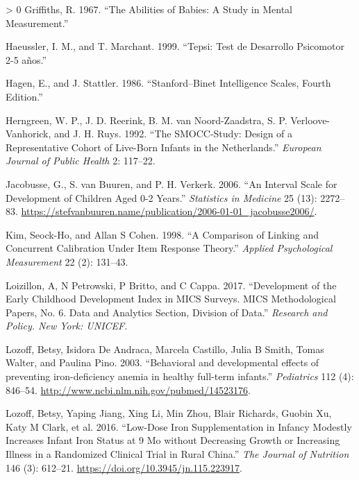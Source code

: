 \documentclass[
]{book}
\newlength{\cslhangindent}
\newenvironment{CSLReferences}[3] %
 {%
  \setlength{\parindent}{0pt}
  \ifodd #1 \everypar{\setlength{\hangindent}{\cslhangindent}}\ignorespaces\fi
  \ifnum #2 > 0
  \setlength{\parskip}{#2\baselineskip}
  \fi
 }%
 {}
\begin{document}
\begin{CSLReferences}{1}{0}
\leavevmode\hypertarget{ref-griffiths1967}{}%
Griffiths, R. 1967. {``The Abilities of Babies: A Study in Mental Measurement.''}

\leavevmode\hypertarget{ref-haeussler1999}{}%
Haeussler, I. M., and T. Marchant. 1999. {``Tepsi: Test de Desarrollo Psicomotor 2-5 años.''}

\leavevmode\hypertarget{ref-hagen1986}{}%
Hagen, E., and J. Stattler. 1986. {``Stanford--Binet Intelligence Scales, Fourth Edition.''}

\leavevmode\hypertarget{ref-herngreen1992}{}%
Herngreen, W. P., J. D. Reerink, B. M. van Noord-Zaadstra, S. P. Verloove-Vanhorick, and J. H. Ruys. 1992. {``The SMOCC-Study: Design of a Representative Cohort of Live-Born Infants in the Netherlands.''} \emph{European Journal of Public Health} 2: 117--22.

\leavevmode\hypertarget{ref-jacobusse2006}{}%
Jacobusse, G., S. van Buuren, and P. H. Verkerk. 2006. {``An Interval Scale for Development of Children Aged 0-2 Years.''} \emph{Statistics in Medicine} 25 (13): 2272--83. \url{https://stefvanbuuren.name/publication/2006-01-01_jacobusse2006/}.

\leavevmode\hypertarget{ref-kim1998}{}%
Kim, Seock-Ho, and Allan S Cohen. 1998. {``A Comparison of Linking and Concurrent Calibration Under Item Response Theory.''} \emph{Applied Psychological Measurement} 22 (2): 131--43.

\leavevmode\hypertarget{ref-loizillon2017}{}%
Loizillon, A, N Petrowski, P Britto, and C Cappa. 2017. {``Development of the Early Childhood Development Index in MICS Surveys. MICS Methodological Papers, No. 6. Data and Analytics Section, Division of Data.''} \emph{Research and Policy. New York: UNICEF}.

\leavevmode\hypertarget{ref-Lozoff2003}{}%
Lozoff, Betsy, Isidora De Andraca, Marcela Castillo, Julia B Smith, Tomas Walter, and Paulina Pino. 2003. {``{Behavioral and developmental effects of preventing iron-deficiency anemia in healthy full-term infants.}''} \emph{Pediatrics} 112 (4): 846--54. \url{http://www.ncbi.nlm.nih.gov/pubmed/14523176}.

\leavevmode\hypertarget{ref-Lozoff2016}{}%
Lozoff, Betsy, Yaping Jiang, Xing Li, Min Zhou, Blair Richards, Guobin Xu, Katy M Clark, et al. 2016. {``{Low-Dose Iron Supplementation in Infancy Modestly Increases Infant Iron Status at 9 Mo without Decreasing Growth or Increasing Illness in a Randomized Clinical Trial in Rural China.}''} \emph{The Journal of Nutrition} 146 (3): 612--21. \url{https://doi.org/10.3945/jn.115.223917}.


\end{CSLReferences}
\end{document}

